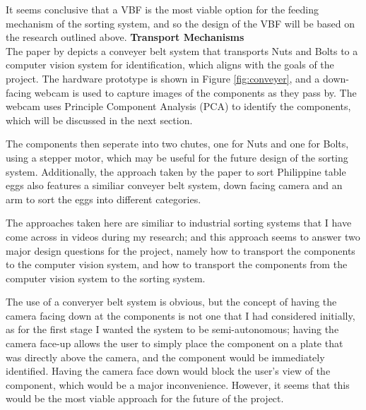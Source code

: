 It seems conclusive that a VBF is the most viable option for the feeding mechanism of the sorting system, and so the design of the VBF will be based on the research outlined above.
\noindent
\textbf{Transport Mechanisms} \\
The paper by \citet{Dhenge2013MechanicalNS} depicts a conveyer belt system that transports Nuts and Bolts to a computer vision system for identification, which aligns with the goals of the project. 
The hardware prototype is shown in Figure \ref*{fig:conveyer}, and a down-facing webcam is used to capture images of the components as they pass by. The webcam uses Principle Component Analysis (PCA) to identify the components,
which will be discussed in the next section.

The components then seperate into two chutes, one for Nuts and one for Bolts, using a stepper motor, which may be useful for the future design of the sorting system.
Additionally, the approach taken by the paper \citet{eggsorting} to sort Philippine table eggs also features a similiar conveyer belt system, down facing camera and an arm to sort the eggs into different categories. 

The approaches taken here are similiar to industrial sorting systems that I have come across in videos during my research; and this approach seems to answer two major design questions for the project, namely
how to transport the components to the computer vision system, and how to transport the components from the computer vision system to the sorting system.

The use of a converyer belt system is obvious, but the concept of having the camera facing down at the components is not one that I had considered initially, as for the first stage I wanted the system to be semi-autonomous;
having the camera face-up allows the user to simply place the component on a plate that was directly above the camera, and the component would be immediately identified. Having the camera face down
would block the user's view of the component, which would be a major inconvenience. However, it seems that this would be the most viable approach for the future of the project.

